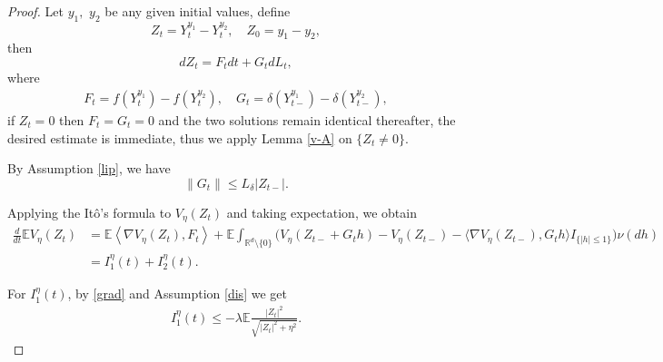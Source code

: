 \documentclass[10pt,a4paper]{amsart}
\begin{document}
\begin{proof}
	Let $y_1,$ $y_2$ be any given initial values, define
	$$	Z_t=Y_t^{y_1}-Y_t^{y_2}, \quad Z_0=y_1-y_2,$$
	then
	$$
	dZ_t=F_tdt+G_tdL_t,
	$$
	where 
	\begin{align*}
		F_t=f(Y_t^{y_1})-f(Y_t^{y_2}),\quad  G_t=\delta(Y_{t-}^{y_1})-\delta(Y_{t-}^{y_2}),	
	\end{align*}
if $Z_t=0$ then $F_t=G_t=0$ and the two solutions remain identical thereafter,
the desired estimate is immediate,  thus we apply
Lemma \ref{v-A} on $\{Z_t\neq0\}$.

	By Assumption \ref{lip}, we have
	\begin{equation}\label{G-est}
		\|G_t\|\leq L_\delta |Z_{t-}|.
	\end{equation}
	
	

	
Applying the It\^o's formula to
	$V_\eta(Z_t)$ and taking expectation, we obtain
	\begin{align*}
		\frac{d}{dt}\mathbb EV_\eta(Z_t)
		&=\mathbb E
		\left\langle\nabla V_\eta(Z_t),F_t
		\right\rangle+\mathbb E
		\int_{\mathbb R^{d}\setminus\{0\}}
		\Big(V_\eta(Z_{t-}+G_th)-V_\eta(Z_{t-})
		-\langle\nabla V_\eta(Z_{t-}),G_th\rangle I_{\{|h|\leq1\}}\Big)\nu(dh)\\
		&=I_1^\eta(t)+I_2^\eta(t).
	\end{align*}
	
	
	For $I_1^\eta(t)$,  by \eqref{grad} 
 and Assumption \ref{dis} we get
	\begin{align}\label{i1}
	I_1^\eta(t)
		\leq 	-\lambda
		\mathbb E
		\frac{|Z_t|^2}
		{\sqrt{|Z_t|^2+\eta^2}}.
	\end{align}
	

\end{proof}
\end{document}
